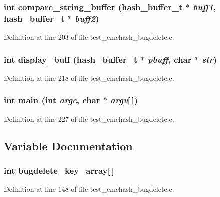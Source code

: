 \subsubsection[{compare\_\-string\_\-buffer}]{\setlength{\rightskip}{0pt plus 5cm}int compare\_\-string\_\-buffer (hash\_\-buffer\_\-t $\ast$ {\em buff1}, \/  hash\_\-buffer\_\-t $\ast$ {\em buff2})}\label{test__cmchash__bugdelete_8c_f183d0c5e0c482d0f02845db8a2f785c}




Definition at line 203 of file test\_\-cmchash\_\-bugdelete.c.
\subsubsection[{display\_\-buff}]{\setlength{\rightskip}{0pt plus 5cm}int display\_\-buff (hash\_\-buffer\_\-t $\ast$ {\em pbuff}, \/  char $\ast$ {\em str})}\label{test__cmchash__bugdelete_8c_d9a0e7d500dc83e14095e7c90c40c5b9}




Definition at line 218 of file test\_\-cmchash\_\-bugdelete.c.
\subsubsection[{main}]{\setlength{\rightskip}{0pt plus 5cm}int main (int {\em argc}, \/  char $\ast$ {\em argv}[$\,$])}\label{test__cmchash__bugdelete_8c_0ddf1224851353fc92bfbff6f499fa97}




Definition at line 227 of file test\_\-cmchash\_\-bugdelete.c.

\subsection{Variable Documentation}
\subsubsection[{bugdelete\_\-key\_\-array}]{\setlength{\rightskip}{0pt plus 5cm}int {\bf bugdelete\_\-key\_\-array}[$\,$]}\label{test__cmchash__bugdelete_8c_426533f981565eb7df9f73106f74eec5}




Definition at line 148 of file test\_\-cmchash\_\-bugdelete.c.